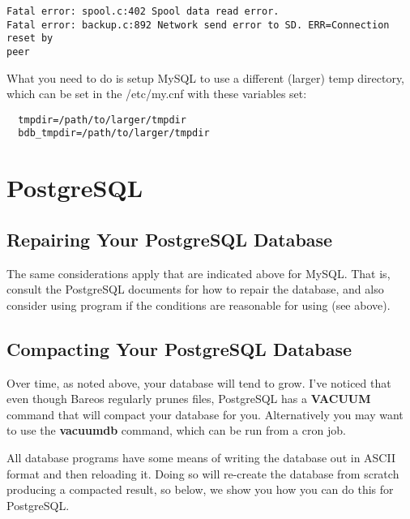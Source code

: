 \footnotesize
\begin{verbatim}
Fatal error: spool.c:402 Spool data read error.
Fatal error: backup.c:892 Network send error to SD. ERR=Connection reset by
peer
\end{verbatim}
\normalsize

What you need to do is setup MySQL to use a different (larger) temp
directory, which can be set in the /etc/my.cnf with these variables
set:

\footnotesize
\begin{verbatim}
  tmpdir=/path/to/larger/tmpdir
  bdb_tmpdir=/path/to/larger/tmpdir
\end{verbatim}
\normalsize

\section{PostgreSQL}

\label{RepairingPSQL}
\subsection{Repairing Your PostgreSQL Database}

The same considerations apply that are indicated above for MySQL. That is,
consult the PostgreSQL documents for how to repair the database, and also
consider using  program if the conditions are reasonable for
using (see above).

\subsection{Compacting Your PostgreSQL Database}
\label{CompactingPostgres}

Over time, as noted above, your database will tend to grow. I've noticed that
even though Bareos regularly prunes files, PostgreSQL has a {\bf VACUUM}
command that will compact your database for you. Alternatively you may want to
use the {\bf vacuumdb} command, which can be run from a cron job.

All database programs have some means of writing the database out in ASCII
format and then reloading it. Doing so will re-create the database from
scratch producing a compacted result, so below, we show you how you can do
this for PostgreSQL.


